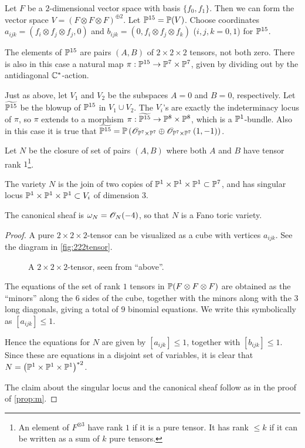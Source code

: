 Let $F$ be a $2$-dimensional vector space with basis $\{f_0,f_1\}$. Then we can form the vector space $V = (F \otimes F \otimes F)^{\oplus 2}$. Let $\P^{15}=\P(V)$. Choose coordinates $a_{ijk}=(f_i \otimes f_j \otimes f_j,0)$ and $b_{ijk}=(0,f_i\otimes f_j \otimes f_k)$ ($i,j,k=0,1$) for $\P^{15}$. 

The elements of $\P^{15}$ are pairs $(A,B)$ of $2 \times 2 \times 2$ tensors, not both zero. There is also in this case a natural map $\pi:\P^{15} \to \P^7 \times \P^7$, given by dividing out by the antidiagonal $\C^\ast$-action.

\begin{remark}
Just as above, let $V_1$ and $V_2$ be the subspaces $A=0$ and $B=0$, respectively. Let $\widetilde{\P^{15}}$ be the blowup of $\P^{15}$ in $V_1 \cup V_2$. The $V_i$'s are exactly the indeterminacy locus of $\pi$, so $\pi$ extends to a morphism $\pi:\widetilde{\P^{15}} \to \P^8 \times \P^8$, which is a $\P^1$-bundle. Also in this case it is true that $\widetilde{\P^{15}}=\P\left(\OO_{\P^7 \times \P^7} \oplus \OO_{\P^7 \times \P^7}\left(1,-1\right)\right)$.
\end{remark}

Let $N$ be the closure of set of pairs $(A,B)$ where both $A$ and $B$ have tensor rank $1$\footnote{An element of $F^{\otimes 3}$ have rank $1$ if it is a pure tensor. It has rank $\leq k$ if it can be written as a sum of $k$ pure tensors.}.

\begin{proposition}
The variety $N$ is the join of two copies of $\P^1 \times \P^1 \times \P^1 \subset \P^7$, and has singular locus $\P^1 \times \P^1 \times \P^1 \subset V_i$ of dimension $3$.

The canonical sheaf is $\omega_N = \OO_N(-4)$, so that $N$ is a Fano toric variety.
\end{proposition}

\begin{proof}
A pure $2 \times 2 \times 2$-tensor can be visualized as a cube with vertices $a_{ijk}$. See the diagram in \vref{fig:222tensor}. 

\begin{figure}[t]
\centering

\caption{A $2 \times 2 \times 2$-tensor, seen from ``above''.}
\label{fig:222tensor}
\end{figure}

The equations of the set of rank $1$ tensors in $\P(F \otimes F \otimes F)$ are obtained as the ``minors'' along the $6$ sides of the cube, together with the minors along with the $3$ long diagonals, giving a total of $9$ binomial equations. We write this symbolically as $[a_{ijk}] \leq 1$. 

Hence the equations for $N$ are given by $[a_{ijk}] \leq 1$, together with $[b_{ijk}] \leq 1$. Since these are equations in a disjoint set of variables, it is clear that ${N=\left(\P^1 \times \P^1 \times \P^1\right)^{\ast 2}}$.

The claim about the singular locus and the canonical sheaf follow as in the proof of \cref{prop:m}.
\end{proof}

